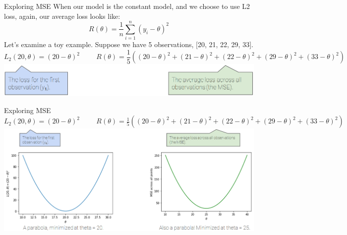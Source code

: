 \documentclass[aspectratio=169]{../latex_main/tntbeamer}  %
\begin{document}
	
	
	\begin{frame}{Exploring MSE}
	    When our model is the constant model, and we choose to use L2 loss, again, our average loss looks like:
	    \begin{equation*}
	        R(\theta) = \frac{1}{n}\sum\limits_{i=1}^n(y_i - \theta)^2
	    \end{equation*}
	    Let’s examine a toy example. Suppose we have 5 observations, [20, 21, 22, 29, 33].
	    \begin{equation*}
	        L_2(20,\theta) = (20 - \theta)^2 \hspace{1cm} R(\theta) = \frac{1}{5}((20 - \theta)^2 + (21-\theta)^2 + (22 - \theta)^2 + (29 - \theta)^2 + (33 - \theta)^2)
	    \end{equation*}
	    \hspace{1cm}\includegraphics[scale=.4]{Bild25}
	\end{frame}
	
	
	
	\begin{frame}{Exploring MSE}
	        $L_2(20,\theta) = (20 - \theta)^2 \hspace{1cm} R(\theta) = \frac{1}{5}((20 - \theta)^2 + (21-\theta)^2 + (22 - \theta)^2 + (29 - \theta)^2 + (33 - \theta)^2)$
	    \includegraphics[scale=.4]{Bild26}
	\end{frame}
\end{document}
